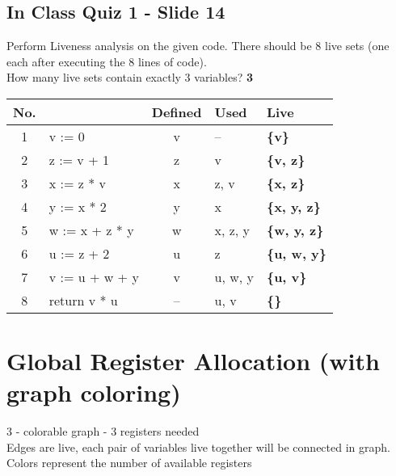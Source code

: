 \documentclass{report}
\begin{document}
\vspace{-1em}
\subsection{In Class Quiz 1 - Slide 14}
\vspace{-1em}
\begin{multicols}{2}
Perform Liveness analysis on the given code. There should
be 8 live sets (one each after executing the 8 lines of code). \\
How many live sets contain exactly 3 variables? \textbf{3}
\vfill\columnbreak
\begin{tabular}{c|l|c|l|>{\bfseries}l}
  \textbf{No.} &  & \textbf{Defined} & \textbf{Used} & \textbf{Live} \\
  \hline
   1  & v := 0            & v  & --      & \{v\}       \\
   2  & z := v + 1        & z  & v       & \{v, z\}    \\
   3  & x := z * v        & x  & z, v    & \{x, z\}    \\
   4  & y := x * 2        & y  & x       & \{x, y, z\} \\
   5  & w := x + z * y    & w  & x, z, y & \{w, y, z\} \\
   6  & u := z + 2        & u  & z       & \{u, w, y\} \\
   7  & v := u + w + y    & v  & u, w, y & \{u, v\}    \\
   8  & return v * u      & -- & u, v    & \{\}        \\
\end{tabular}
\end{multicols}


\section{Global Register Allocation (with graph coloring)}
3 - colorable graph - 3 registers needed \\
Edges are live, each pair of variables live together will be connected in graph. \\
Colors represent the number of available registers \\

\newpage
\end{document}
